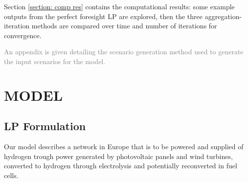 Section \ref{section: comp res} contains the computational results: some example outputs from the perfect foresight LP are explored, then the three aggregation-iteration methods are compared over time and number of iterations for convergence.

\textcolor{gray}{An appendix is given detailing the scenario generation method used to generate the input scenarios for the model. }











\section{MODEL}\label{section: model}

\subsection{LP Formulation}\label{subsection: LP}
Our model describes a network in Europe that is to be powered and supplied of hydrogen trough power generated by photovoltaic panels and wind turbines, converted to hydrogen through electrolysis and potentially reconverted in fuel cells.

